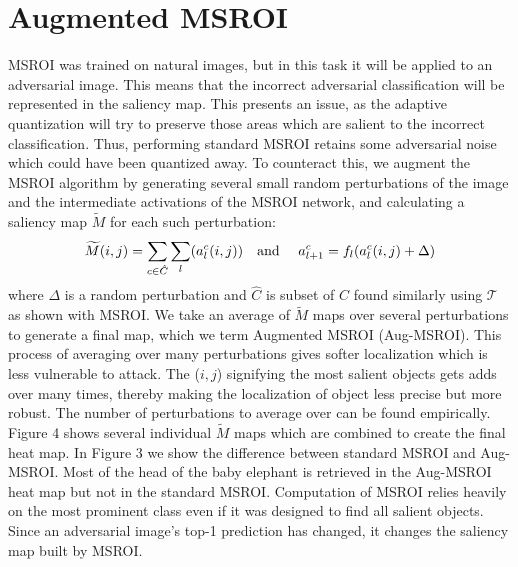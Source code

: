 \section{Augmented MSROI}
MSROI was trained on natural images, but in this task it will be applied to an adversarial image. 
This means that the incorrect adversarial classification will be represented in the saliency map.
This presents an issue, as the adaptive quantization will try to preserve those areas which are salient to the incorrect classification. 
Thus, performing standard MSROI retains some adversarial noise which could have been quantized away.
To counteract this, we augment the MSROI algorithm by generating several small random perturbations of the image and the intermediate activations of the MSROI network, and calculating a saliency map $\widetilde{M}$ for each such perturbation:
\[
\widetilde{M}(i,j) = \sum_{c \in \hat{C}}  \sum_l (a_l^c(i ,j))  \text{\quad and \quad} a_{l+1}^c = f_l(a_l^c(i,j) +\Delta)
\]
where $\Delta$ is a random perturbation and $\hat{C}$ is subset of $C$ found similarly using $\mathcal{T}$ as shown with MSROI.
We take an average of $\widetilde{M}$ maps over several perturbations to generate a final map, which we term Augmented MSROI (Aug-MSROI).
This process of averaging over many perturbations gives softer localization which is less vulnerable to attack.
The ($i,j$) signifying the most salient objects gets adds over many times, thereby making the localization of object less precise but more robust.
The number of perturbations to average over can be found empirically.  
Figure 4 shows several individual $\widetilde{M}$ maps which are combined to create the final heat map. 
In Figure 3 we show the difference between standard MSROI and Aug-MSROI. 
Most of the head of the baby elephant is retrieved in the Aug-MSROI heat map but not in the standard MSROI. 
Computation of MSROI relies heavily on the most prominent class even if it was designed to find all salient objects.
Since an adversarial image's top-1 prediction has changed, it changes the saliency map built by MSROI.

